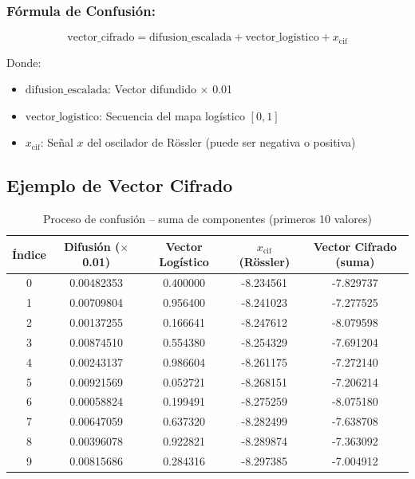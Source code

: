 \documentclass[12pt,a4paper]{article}
\begin{document}
	\subsubsection*{Fórmula de Confusión:}
	\begin{equation}
		\text{vector\_cifrado} = \text{difusion\_escalada} + \text{vector\_logistico} + x_{\text{cif}}
		\label{eq:confusion}
	\end{equation}
	
	Donde:
	\begin{itemize}
		\item $\text{difusion\_escalada}$: Vector difundido $\times$ 0.01
		\item $\text{vector\_logistico}$: Secuencia del mapa logístico $[0, 1]$
		\item $x_{\text{cif}}$: Señal $x$ del oscilador de Rössler (puede ser negativa o positiva)
	\end{itemize}
	
	\subsection{Ejemplo de Vector Cifrado}
	
	\begin{table}[H]
		\centering
		\caption{Proceso de confusión -- suma de componentes (primeros 10 valores)}
		\label{tab:confusion}
		\small
		\begin{tabular}{@{}ccccc@{}}
			\toprule
			\textbf{Índice} & \textbf{Difusión ($\times$0.01)} & \textbf{Vector Logístico} & \textbf{$x_{\text{cif}}$ (Rössler)} & \textbf{Vector Cifrado (suma)} \\ \midrule
			0 & 0.00482353 & 0.400000 & -8.234561 & -7.829737 \\
			1 & 0.00709804 & 0.956400 & -8.241023 & -7.277525 \\
			2 & 0.00137255 & 0.166641 & -8.247612 & -8.079598 \\
			3 & 0.00874510 & 0.554380 & -8.254329 & -7.691204 \\
			4 & 0.00243137 & 0.986604 & -8.261175 & -7.272140 \\
			5 & 0.00921569 & 0.052721 & -8.268151 & -7.206214 \\
			6 & 0.00058824 & 0.199491 & -8.275259 & -8.075180 \\
			7 & 0.00647059 & 0.637320 & -8.282499 & -7.638708 \\
			8 & 0.00396078 & 0.922821 & -8.289874 & -7.363092 \\
			9 & 0.00815686 & 0.284316 & -8.297385 & -7.004912 \\ \bottomrule
		\end{tabular}
	\end{table}
	
\end{document}
